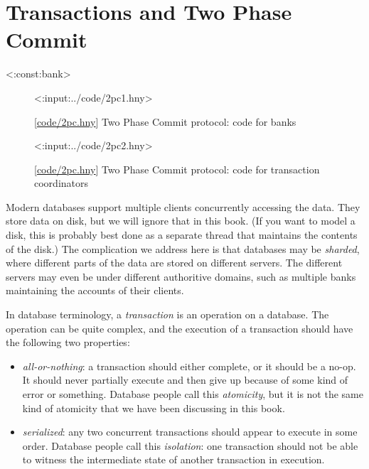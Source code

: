 \documentclass{report}
\newcommand{\harmonylink}[1]{%
[\href{https://harmony.cs.cornell.edu/#1}{\underline{#1}}]%
}
\newenvironment{code}{
\tcolorbox
}{
\endtcolorbox
}
\begin{document}
\chapter{Transactions and Two Phase Commit}
\label{ch:2pc}

<{:const:bank}>

\begin{figure}
\begin{code}
<{:input:../code/2pc1.hny}>
\end{code}
\caption{\harmonylink{code/2pc.hny} Two Phase Commit protocol: code for banks}
\label{fig:2pc1}
\end{figure}

\begin{figure}
\begin{code}
<{:input:../code/2pc2.hny}>
\end{code}
\caption{\harmonylink{code/2pc.hny} Two Phase Commit protocol: code for transaction coordinators}
\label{fig:2pc2}
\end{figure}

Modern databases support multiple clients concurrently accessing the data.
They store data on disk, but we will ignore that in this book.
(If you want to model a disk, this is probably best done as a separate
thread that maintains the contents of the disk.)
The complication we address here is that databases may be \emph{sharded},
where different parts of the data are stored on different servers.
The different servers may even be under different
authoritive domains, such as multiple banks maintaining the accounts of their
clients.

In database terminology, a \emph{transaction} is an operation on a database.
The operation can be quite complex, and the execution of a transaction
should have the following two properties:
\begin{itemize}
\item \emph{all-or-nothing}: a transaction should either complete, or it should
be a no-op.  It should never partially execute and then give up because of
some kind of error or something.  Database
people call this \emph{atomicity}, but it is not the same kind of atomicity that
we have been discussing in this book.
\item \emph{serialized}: any two concurrent transactions should appear to
execute in some order.  Database people call this \emph{isolation}: one transaction
should not be able to witness the intermediate state of another transaction
in execution.
\end{itemize}
\end{document}
